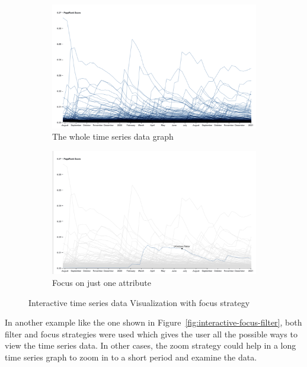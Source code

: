 \begin{figure}[H]
\begin{subfigure}{.45\textwidth}
  \centering
  \captionsetup{justification=centering}
  \includegraphics[width=.8\linewidth]{./pics/time21.png}  
  \caption{The whole time series data graph}
  \label{fig:sub-first-time21}
\end{subfigure}
\begin{subfigure}{.45\textwidth}
  \centering
  \captionsetup{justification=centering}
  \includegraphics[width=0.8\linewidth]{./pics/time22.png}  
  \caption{Focus on just one attribute}
  \label{fig:sub-second-time22}
\end{subfigure}
\captionsetup{justification=centering}
\caption{Interactive time series data Visualization with focus strategy \cite{multiplelines} }
\label{fig:interactive-ts}
\end{figure}


In another example like the one shown in Figure~\ref{fig:interactive-focus-filter}, both filter and focus strategies were used which gives the user all the possible ways to view the time series data. In other cases, the zoom strategy could help in a long time series graph to zoom in to a short period and examine the data. 

